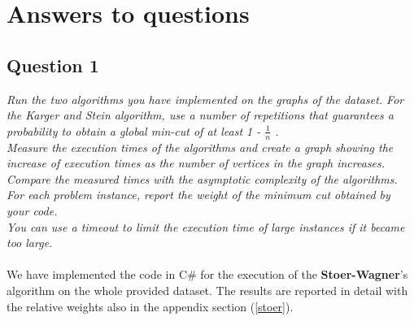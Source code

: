 \section{Answers to questions}

\subsection{Question 1}
\textit{Run the two algorithms you have implemented on the graphs of the dataset. For the Karger and Stein algorithm, use a number of repetitions that guarantees a probability to obtain a global min-cut of at least 1 - \(\frac{1}{n}\) .\\
Measure the execution times of the algorithms and create a graph showing the increase of execution times as the number of vertices in the graph increases. Compare the measured times with the asymptotic complexity of the algorithms. For each problem instance, report the weight of the minimum cut obtained by your code.\\
You can use a timeout to limit the execution time of large instances if it became too large.
}\\ \\
\noindent
We have implemented the code in C\# for the execution of the \textbf{Stoer-Wagner}'s algorithm on the whole provided dataset.
The results are reported in detail with the relative weights also in the appendix section (\ref{stoer}).

